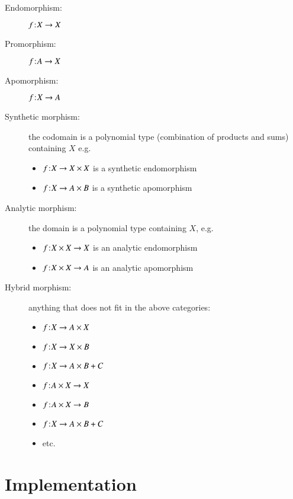 \begin{description}
\item[Endomorphism\footnotemark:] \(f\hspace{1pt}\mathpunct{:}\hspace{-1pt}X\rightarrow{}X\)
\item[Promorphism\footnotemark:] \(f\hspace{1pt}\mathpunct{:}\hspace{-1pt}A\rightarrow{}X\)
\item[Apomorphism\footnotemark:] \(f\hspace{1pt}\mathpunct{:}\hspace{-1pt}X\rightarrow{}A\)
\item[Synthetic morphism:] the codomain is a polynomial type
  (combination of products and sums) containing \(X\) e.g.
  \begin{itemize}
  \item \(f\hspace{1pt}\mathpunct{:}\hspace{-1pt}X\rightarrow{}X\times X\) is a synthetic endomorphism
  \item \(f\hspace{1pt}\mathpunct{:}\hspace{-1pt}X\rightarrow{}A\times B\) is a synthetic apomorphism
  \end{itemize}
\item[Analytic morphism:] the domain is a polynomial type containing \(X\), e.g.
  \begin{itemize}
    \item \(f\hspace{1pt}\mathpunct{:}\hspace{-1pt}X\times X\rightarrow{}X\) is an analytic endomorphism
    \item \(f\hspace{1pt}\mathpunct{:}\hspace{-1pt}X\times X\rightarrow{}A\) is an analytic apomorphism
  \end{itemize}
\item[Hybrid morphism:] anything that does not fit in the above categories:
  \begin{itemize}
  \item \(f\hspace{1pt}\mathpunct{:}\hspace{-1pt}X\rightarrow{}A\times X\)
  \item \(f\hspace{1pt}\mathpunct{:}\hspace{-1pt}X\rightarrow{}X\times B\)
  \item \(f\hspace{1pt}\mathpunct{:}\hspace{-1pt}X\rightarrow{}A\times B + C\)
  \item \(f\hspace{1pt}\mathpunct{:}\hspace{-1pt}A\times X\rightarrow{}X\)
  \item \(f\hspace{1pt}\mathpunct{:}\hspace{-1pt}A\times X\rightarrow{}B\)
  \item \(f\hspace{1pt}\mathpunct{:}\hspace{-1pt}X\rightarrow{}A\times B + C\)
  \item etc.
  \end{itemize}
\end{description}


\section{Implementation}

